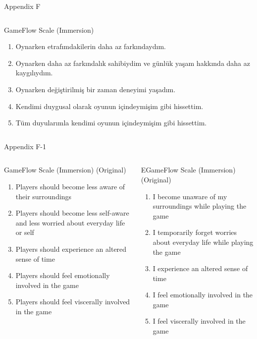 \documentclass{beamer}
\begin{document}
\begin{frame}[label=appF, plain]{Appendix F}
     \fontsize{10pt}{10}\selectfont
  \begin{columns}[t]
    \begin{exampleblock}{GameFlow Scale (Immersion)}

\begin{enumerate}
\item Oynarken etrafımdakilerin daha az farkındaydım.
\item Oynarken daha az farkındalık sahibiydim ve günlük yaşam hakkında daha az kaygılıydım.
\item Oynarken değiştirilmiş bir zaman deneyimi yaşadım.
\item Kendimi duygusal olarak oyunun içindeymişim gibi hissettim.
\item Tüm duyularımla kendimi oyunun içindeymişim gibi hissettim.
\end{enumerate}

    \end{exampleblock}
  \end{columns}  
\end{frame}

\begin{frame}[label=appF1, plain]{Appendix F-1}
     \fontsize{10pt}{10}\selectfont
  \begin{columns}[t]
    \begin{exampleblock}{GameFlow Scale (Immersion) (Original) \cite{Sweetser2005flow}}

\begin{enumerate}
\item Players should become less aware of their surroundings
\item Players should become less self-aware and less worried
about everyday life or self
\item Players should experience an altered sense of time
\item Players should feel emotionally involved in the game
\item Players should feel viscerally involved in the game
\end{enumerate}
\end{exampleblock}

\begin{exampleblock}{EGameFlow Scale (Immersion) (Original) \cite{Fu2009EGameFlow}}
\begin{enumerate}
\item I become unaware of my surroundings while playing the game
\item I temporarily forget worries about everyday life while playing the game
\item I experience an altered sense of time
\item I feel emotionally involved in the game
\item I feel viscerally involved in the game
\end{enumerate}
\end{exampleblock}
  \end{columns}  
\end{frame}
\end{document}
